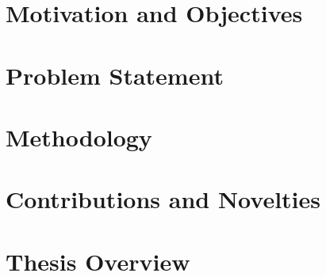\section{Motivation and Objectives}


\section{Problem Statement}


\section{Methodology}


\section{Contributions and Novelties}


\section{Thesis Overview}

